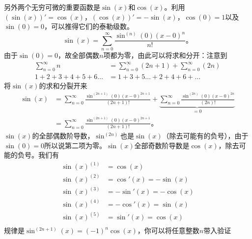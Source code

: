 另外两个无穷可微的重要函数是$\sin(x)$和$\cos(x)$。利用$(\sin(x))'=\cos(x)$，$(\cos(x))'=-\sin(x)$，$\cos(0)=1$以及$\sin(0)=0$，可以推得它们的泰勒级数。
\begin{equation*}
\sin(x) = \sum\limits_{n=0}^\infty \frac{\sin^{(n)}(0)(x-0)^n}{n!}\text{。}
\end{equation*}
由于$\sin(0)=0$，故全部偶数$n$项都为零，由此可以将求和分开：注意到
\begin{equation}
\begin{aligned}
\sum_{n=0}^{\infty}n &= \sum_{n=0}^\infty (2n+1) + \sum_{n=0}^\infty (2n) \\
1+2+3+4+5+6\dots &= 1+3+5\dots + 2+4+6+\dots
\end{aligned}
\end{equation}
将$\sin(x)$的求和分裂开来
\begin{equation}
\begin{aligned}
\sin(x) &= \sum\limits_{n=0}^\infty \frac{\sin^{(2n+1)}(0)(x-0)^{2n+1}}{(2n+1)!}+ \underbrace{\sum\limits_{n=0}^\infty \frac{\sin^{(2n)}(0)(x-0)^{2n}}{(2n)!}}_{=0} \\
 &= \sum\limits_{n=0}^\infty \frac{\sin^{(2n+1)}(0)(x-0)^{2n+1}}{(2n+1)!}\text{。}
\end{aligned}
\label{equ.appendix.B.16}
\end{equation}
$\sin(x)$的全部偶数阶导数，$\sin^{(2n)}$也是$\sin(x)$（除去可能有的负号），由于$\sin(0)=0$所以说第二项为零。$\sin(x)$全部奇数阶导数是$\cos(x)$，除去可能的负号。我们有
\begin{equation}
\begin{aligned}
\sin(x)^{(1)}&=\cos(x) \\
\sin(x)^{(2)}&=\cos'(x)=-\sin(x) \\
\sin(x)^{(3)}&=-\sin'(x)=-\cos(x) \\
\sin(x)^{(4)}&=-\cos'(x)=\sin(x) \\
\sin(x)^{(5)}&=\sin'(x)=\cos(x) \\
\end{aligned}
\end{equation}
规律是$\sin^{(2n+1)}(x)=(-1)^n\cos(x)$，你可以将任意整数$n$带入验证%
%
